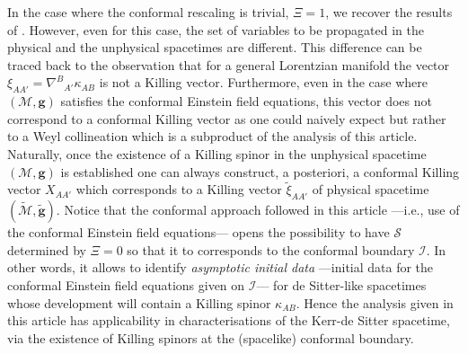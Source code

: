 \documentclass[10pt,a4paper]{article}
\theoremstyle{plain}
\def\bmg{{\bm g}}
\begin{document}
In the case where the conformal rescaling is
trivial, $\Xi = 1$, we recover the results of
\cite{BaeVal10b}. However, even for this case, the set of variables to
be propagated in the physical and the unphysical spacetimes
are different.  This difference can be traced back to the observation
that for a general Lorentzian manifold the vector
$\xi_{AA'}=\nabla^{B}{}_{A'}\kappa_{AB}$ is not a Killing vector.
Furthermore, even in the case where $(\mathcal{M},\bmg)$ satisfies the
conformal Einstein field equations, this vector does not correspond to
a conformal Killing vector as one could naively expect but rather to a
Weyl collineation which is a subproduct of the analysis of this
article. Naturally, once the existence of a
Killing spinor in the unphysical spacetime $(\mathcal{M},\bmg)$ is
established one can always construct, a posteriori, a conformal
Killing vector $X_{AA'}$ which corresponds to a Killing vector
$\tilde{\xi}_{AA'}$ of physical spacetime
$(\tilde{\mathcal{M}},\tilde{\bmg})$.
Notice that the conformal approach followed in this article ---i.e.,
use of the conformal Einstein field equations--- opens the possibility
to have $\mathcal{S}$ determined by $\Xi = 0$ so that it to
corresponds to the conformal boundary $\mathscr{I}$.  In other words,
it allows to identify \emph{asymptotic initial data} ---initial data for the
conformal Einstein field equations given on $\mathscr{I}$--- for de
Sitter-like spacetimes whose development will contain a Killing spinor
$\kappa_{AB}$.  Hence the analysis given in this article has
applicability in characterisations of the Kerr-de Sitter
spacetime, via the existence of Killing spinors at the (spacelike)
conformal boundary.
\end{document}
